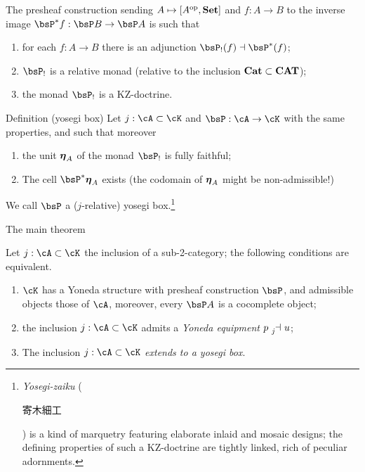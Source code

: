 \documentclass{beamer}
\begin{document}
\begin{frame}
	The presheaf construction sending $A\mapsto [A^{\text{op}},\mathbf{Set}]$ and $f : A\to B$ to the inverse image $\bsP^*f : \bsP B\to \bsP A$ is such that
	\begin{enumerate}
		\item<2-> for each $f : A\to B$ there is an adjunction $\bsP_!(f) \dashv  \bsP^*(f)$;
		\item<3-> $\bsP_!$ is a \alert{relative monad} (relative to the inclusion $\mathbf{Cat} \subset \mathbf{CAT}$);
		\item<4-> the monad $\bsP_!$ is a \alert{KZ-doctrine}.
	\end{enumerate}
\end{frame}
\begin{frame}
	\begin{block}{Definition (yosegi box)}
		Let $j: \cA \subset \cK$ and $\bsP : \cA\to \cK$ with the same properties, and such that moreover
		\begin{enumerate}
			\item the unit $\boldsymbol{\eta}_A$ of the monad $\bsP_!$ is fully faithful;
			\item<2-> The cell $\bsP^*\myeta_A$ exists (the codomain of $\boldsymbol{\eta}_A$ might be non-admissible!)
		\end{enumerate}
				We call $\bsP$ a ($j$-relative) \alert{yosegi box.}\onslide<4->\footnote{\emph{Yosegi-zaiku} (\begin{CJK}{UTF8}{min}寄木細工\end{CJK}) is a kind of marquetry featuring elaborate inlaid and mosaic designs; the defining properties of such a KZ-doctrine are tightly linked, rich of peculiar adornments.}
	\end{block}

\end{frame}
\begin{frame}{The main theorem}
	\begin{block}{}
		Let $j : \cA\subset \cK$ the inclusion of a sub-2-category; the following conditions are equivalent.
		\begin{enumerate}
			\item<2-> $\cK$ has a Yoneda structure with presheaf construction $\bsP$, and admissible objects those of $\cA$, moreover, every $\bsP A$ is a cocomplete object;
			\item<3-> the inclusion $j : \cA\subset \cK$ admits a \emph{Yoneda equipment} $p \reladjL{j} u$;
			\item<4-> The inclusion $j : \cA \subset \cK$ \emph{extends to a yosegi box}.
		\end{enumerate}
	\end{block}
\end{frame}
\end{document}
